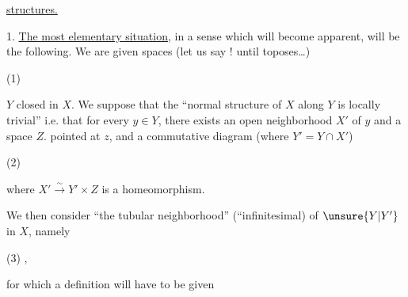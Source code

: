 
\uline{ structures.}

1. \uline{The most elementary situation}, in a sense which will become apparent, will be the following. We are given spaces (let us say !\unsure{)|\}} until   toposes\ldots)

(1)

$Y$ closed in $X$. We suppose that the ``normal structure of $X$ along $Y$ is locally trivial''\unsure{)|\}} i.e. that for every $y\in Y$, there exists an open neighborhood $X'$ of $y$ and a space $Z$. pointed at $z$, and a commutative diagram (where $Y'=Y\cap X'$)

(2)

where $X'\xrightarrow{\sim}Y'\times Z$ is a homeomorphism.

We then consider ``the tubular neighborhood'' (``infinitesimal) of $\unsure{Y|Y'}$ in $X$, namely

(3)
,

for which a definition will have to be given


